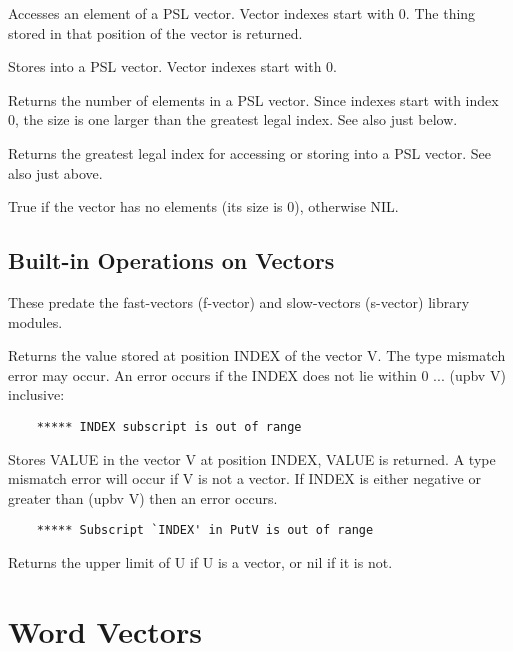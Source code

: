 {    Accesses an element of a PSL vector.  Vector  indexes  start
    with  0.  The thing stored in that position of the vector is
    returned.
}

{    Stores into a PSL vector.  Vector indexes start with 0.
}

{    Returns the number of elements  in  a  PSL  vector.    Since
    indexes  start with index 0, the size is one larger than the
    greatest legal index.  See also just below.
}

{    Returns the greatest legal index for  accessing  or  storing
    into a PSL vector.  See also just above.
}

{    True  if  the  vector  has  no  elements  (its  size  is 0),
    otherwise NIL.
}
\subsection{Built-in Operations on Vectors}

These predate the fast-vectors (f-vector) and slow-vectors (s-vector)
library modules.


{    Returns  the    value   stored  at  position  INDEX  of  the
    vector V.  The type mismatch error may   occur.    An  error
    occurs  if    the  INDEX  does not lie within 0 ... (upbv V)
    inclusive:
}
\begin{verbatim}
    ***** INDEX subscript is out of range
\end{verbatim}

{    Stores VALUE in the vector V at  position  INDEX,  VALUE  is
    returned.    A  type mismatch error will occur if V is not a
    vector.  If INDEX is either negative or greater  than  (upbv
    V) then an error occurs.
}
\begin{verbatim}
    ***** Subscript `INDEX' in PutV is out of range
\end{verbatim}

{    Returns  the upper limit of U if U is a vector, or nil if it
    is not.
}
\section{Word Vectors}

